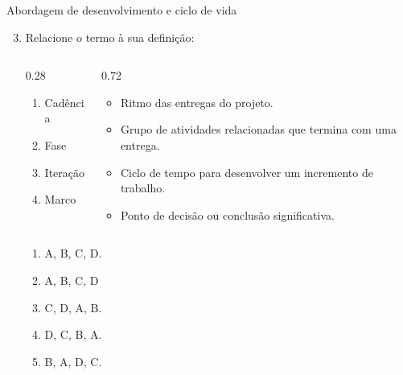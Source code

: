 \documentclass{beamer}
\begin{document}
\begin{frame}{Abordagem de desenvolvimento e ciclo de vida}
	\begin{enumerate}
		\setcounter{enumi}{2}
		\justifying
		\item Relacione o termo à sua definição:
		\begin{columns}
			\begin{column}{0.28\textwidth}
				\begin{enumerate}[A]
					\item Cadência
					\item Fase
					\item Iteração
					\item Marco
				\end{enumerate}
			\end{column}
			\begin{column}{0.72\textwidth}
				\begin{itemize}
					\item Ritmo das entregas do projeto.
					\item Grupo de atividades relacionadas que termina com uma entrega.
					\item Ciclo de tempo para desenvolver um incremento de trabalho.
					\item Ponto de decisão ou conclusão significativa.
				\end{itemize}
			\end{column}
		\end{columns}
		\begin{enumerate}[a]
			\item A, B, C, D.
			\item \alert<2>{A, B, C, D}
			\item C, D, A, B.
			\item D, C, B, A.
			\item B, A, D, C.
		\end{enumerate}
	\end{enumerate}
\end{frame}
\end{document}
